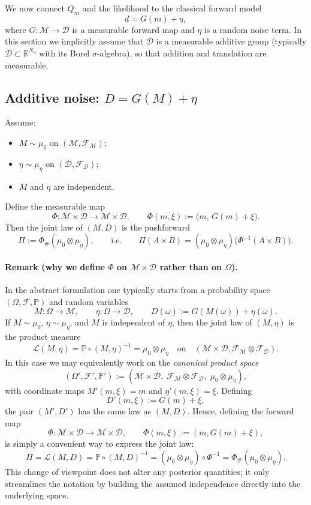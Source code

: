 \documentclass[11pt]{article}
\theoremstyle{remark}
\newcommand{\modelspace}{\mathcal{M}}
\newcommand{\dataspace}{\mathcal{D}}
\begin{document}
We now connect \(Q_m\) and the likelihood to the classical forward model
\[
d = G(m) + \eta,
\]
where \(G:\modelspace\to\dataspace\) is a measurable forward map and \(\eta\) is
a random noise term.  In this section we implicitly assume that \(\dataspace\)
is a measurable additive group (typically \(\dataspace\subset\mathbb{R}^{N_d}\)
with its Borel \(\sigma\)-algebra), so that addition and translation are measurable.

\subsection{Additive noise: \(D = G(M) + \eta\)}
Assume:
\begin{itemize}
    \item \(M\sim \mu_0\) on \((\modelspace,\mathcal{F}_{\modelspace})\);
    \item \(\eta\sim \mu_\eta\) on \((\dataspace,\mathcal{F}_{\dataspace})\);
    \item \(M\) and \(\eta\) are independent.
\end{itemize}
Define the measurable map
\[
\Phi:\modelspace\times\dataspace \to \modelspace\times\dataspace,
\qquad
\Phi(m,\xi) := \bigl(m,\,G(m)+\xi\bigr).
\]
Then the joint law of \((M,D)\) is the pushforward
\begin{equation}\label{eq:Pi-pushforward-noise}
\Pi := \Phi_\#(\mu_0\otimes \mu_\eta),
\qquad\text{i.e.}\qquad
\Pi(A\times B) = (\mu_0\otimes\mu_\eta)\!\bigl(\Phi^{-1}(A\times B)\bigr).
\end{equation}

\paragraph{Remark (why we define \(\Phi\) on \(\modelspace\times\dataspace\) rather than on \(\Omega\)).}
In the abstract formulation one typically starts from a probability space
\((\Omega,\mathcal{F},\mathbb{P})\) and random variables
\[
M:\Omega\to\modelspace,
\qquad
\eta:\Omega\to\dataspace,
\qquad
D(\omega):=G(M(\omega))+\eta(\omega).
\]
If \(M\sim \mu_0\), \(\eta\sim \mu_\eta\), and \(M\) is independent of \(\eta\), then the
joint law of \((M,\eta)\) is the product measure
\[
\mathcal{L}(M,\eta)=\mathbb{P}\circ (M,\eta)^{-1}=\mu_0\otimes \mu_\eta
\quad\text{on}\quad
(\modelspace\times\dataspace,\mathcal{F}_{\modelspace}\otimes\mathcal{F}_{\dataspace}).
\]
In this case we may equivalently work on the \emph{canonical product space}
\[
(\Omega',\mathcal{F}',\mathbb{P}')
:=
(\modelspace\times\dataspace,\;\mathcal{F}_{\modelspace}\otimes\mathcal{F}_{\dataspace},\;\mu_0\otimes\mu_\eta),
\]
with coordinate maps \(M'(m,\xi)=m\) and \(\eta'(m,\xi)=\xi\).  Defining
\[
D'(m,\xi):=G(m)+\xi,
\]
the pair \((M',D')\) has the same law as \((M,D)\).
Hence, defining the forward map
\[
\Phi:\modelspace\times\dataspace\to\modelspace\times\dataspace,
\qquad
\Phi(m,\xi):=(m,G(m)+\xi),
\]
is simply a convenient way to express the joint law:
\[
\Pi
=
\mathcal{L}(M,D)
=
\mathbb{P}\circ(M,D)^{-1}
=
(\mu_0\otimes\mu_\eta)\circ \Phi^{-1}
=
\Phi_\#(\mu_0\otimes\mu_\eta).
\]
This change of viewpoint does not alter any posterior quantities; it only streamlines
the notation by building the assumed independence directly into the underlying space.
\end{document}
